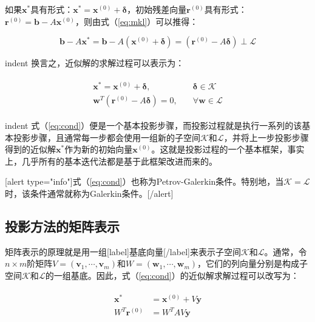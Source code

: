 \documentclass[UTF8,nofonts]{ctexart}
\begin{document}
如果$\boldsymbol{x}^\ast$具有形式：$\boldsymbol{x}^\ast=\boldsymbol{x}^{(0)}+\boldsymbol{\delta}$，初始残差向量$\boldsymbol{r}^{(0)}$具有形式：$\boldsymbol{r}^{(0)}=\boldsymbol{b}-A\boldsymbol{x}^{(0)}$，则由式（\ref{eq:mkl}）可以推得：

\[
\boldsymbol{b}-A\boldsymbol{x}^\ast=\boldsymbol{b}-A(\boldsymbol{x}^{(0)}+\boldsymbol{\delta})=(\boldsymbol{r}^{(0)}-A\boldsymbol{\delta})\perp\mathcal{L}
\]

indent 换言之，近似解的求解过程可以表示为：

\begin{align}
\label{eq:cond}
\begin{split}
\boldsymbol{x}^\ast=\boldsymbol{x}^{(0)}+\boldsymbol{\delta},&\quad\boldsymbol{\delta}\in\mathcal{K} \\
\boldsymbol{w}^T(\boldsymbol{r}^{(0)}-A\boldsymbol{\delta})=0,&\quad\forall\boldsymbol{w}\in\mathcal{L}
\end{split}
\end{align}

indent 式（\ref{eq:cond}）便是一个基本投影步骤，而投影过程就是执行一系列的该基本投影步骤，且通常每一步都会使用一组新的子空间$\mathcal{K}$和$\mathcal{L}$，并将上一步投影步骤得到的近似解$\boldsymbol{x}^\ast$作为新的初始向量$\boldsymbol{x}^{(0)}$。这就是投影过程的一个基本框架，事实上，几乎所有的基本迭代法都是基于此框架改进而来的。

[alert type="info"]式（\ref{eq:cond}）也称为Petrov-Galerkin条件。特别地，当$\mathcal{K}=\mathcal{L}$时，该条件通常就称为Galerkin条件。[/alert]

\subsection*{投影方法的矩阵表示}

矩阵表示的原理就是用一组[label]基底向量[/label]来表示子空间$\mathcal{K}$和$\mathcal{L}$。通常，令$n \times m$阶矩阵$V=(\boldsymbol{v}_1,\cdots,\boldsymbol{v}_m)$和$W=(\boldsymbol{w}_1,\cdots,\boldsymbol{w}_m)$，它们的列向量分别是构成子空间$\mathcal{K}$和$\mathcal{L}$的一组基底。因此，式（\ref{eq:cond}）的近似解求解过程可以改写为：

\begin{align}
\label{eq:condmat}
\begin{split}
\boldsymbol{x}^\ast&=\boldsymbol{x}^{(0)}+V\boldsymbol{y} \\
W^T\boldsymbol{r}^{(0)}&=W^TAV\boldsymbol{y}
\end{split}
\end{align}
\end{document}
